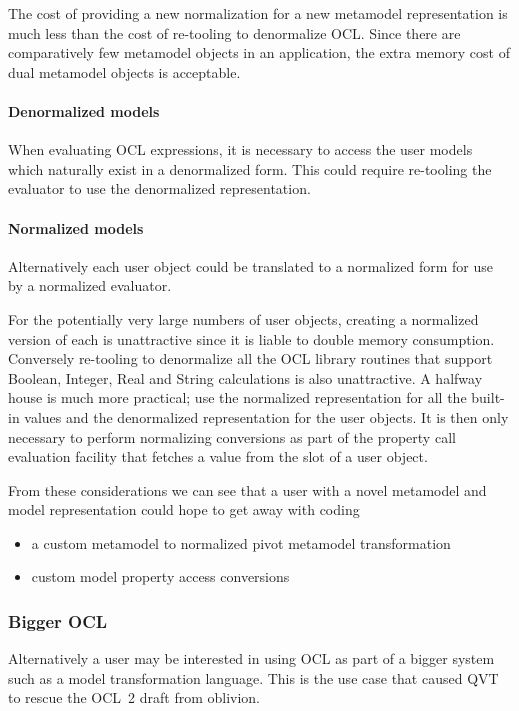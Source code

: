 \documentclass{jot}
\begin{document}
The cost of providing a new normalization for a new metamodel representation is much less than the cost of re-tooling to denormalize OCL. Since there are comparatively few metamodel objects in an application, the extra memory cost of dual metamodel objects is acceptable.

\paragraph{Denormalized models} When evaluating OCL expressions, it is necessary to access the user models which naturally exist in a denormalized form. This could require re-tooling the evaluator to use the denormalized representation. 

\paragraph{Normalized models} Alternatively each user object could be translated to a normalized form for use by a normalized evaluator.

For the potentially very large numbers of user objects, creating a normalized version of each is unattractive since it is liable to double memory consumption. Conversely re-tooling to denormalize all the OCL library routines that support Boolean, Integer, Real and String calculations is also unattractive. A halfway house is much more practical; use the normalized representation for all the built-in values and the denormalized representation for the user objects. It is then only necessary to perform normalizing conversions as part of the property call evaluation facility that fetches a value from the slot of a user object.

From these considerations we can see that a user with a novel metamodel and model representation could hope to get away with coding
\begin{itemize}
	\item a custom metamodel to normalized pivot metamodel transformation
	\item custom model property access conversions
\end{itemize}

\subsubsection{Bigger OCL}

Alternatively a user may be interested in using OCL as part of a bigger system such as a model transformation language. This is the use case that caused QVT to rescue the OCL~2 draft from oblivion.
\end{document}
